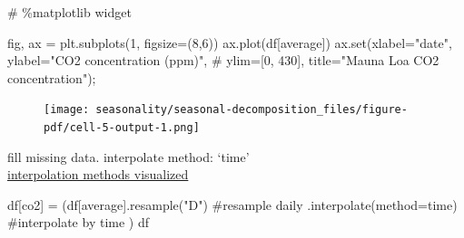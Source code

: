 \documentclass[
  letterpaper,
  DIV=11,
  numbers=noendperiod,
  oneside]{scrreprt}
\newenvironment{Shaded}{\begin{snugshade}}{\end{snugshade}}
\newcommand{\BuiltInTok}[1]{\textcolor[rgb]{0.00,0.23,0.31}{#1}}
\newcommand{\CommentTok}[1]{\textcolor[rgb]{0.37,0.37,0.37}{#1}}
\newcommand{\DecValTok}[1]{\textcolor[rgb]{0.68,0.00,0.00}{#1}}
\newcommand{\NormalTok}[1]{\textcolor[rgb]{0.00,0.23,0.31}{#1}}
\newcommand{\OperatorTok}[1]{\textcolor[rgb]{0.37,0.37,0.37}{#1}}
\newcommand{\StringTok}[1]{\textcolor[rgb]{0.13,0.47,0.30}{#1}}
\begin{document}
\begin{Shaded}
\begin{Highlighting}[]
\CommentTok{\# \%matplotlib widget}

\NormalTok{fig, ax }\OperatorTok{=}\NormalTok{ plt.subplots(}\DecValTok{1}\NormalTok{, figsize}\OperatorTok{=}\NormalTok{(}\DecValTok{8}\NormalTok{,}\DecValTok{6}\NormalTok{))}
\NormalTok{ax.plot(df[}\StringTok{\textquotesingle{}average\textquotesingle{}}\NormalTok{])}
\NormalTok{ax.}\BuiltInTok{set}\NormalTok{(xlabel}\OperatorTok{=}\StringTok{"date"}\NormalTok{,}
\NormalTok{       ylabel}\OperatorTok{=}\StringTok{"CO2 concentration (ppm)"}\NormalTok{,}
       \CommentTok{\# ylim=[0, 430],}
\NormalTok{       title}\OperatorTok{=}\StringTok{"Mauna Loa CO2 concentration"}\NormalTok{)}\OperatorTok{;}
\end{Highlighting}
\end{Shaded}

\begin{figure}[H]

{\centering \texttt{[image: seasonality/seasonal-decomposition\_files/figure-pdf/cell-5-output-1.png]}

}

\end{figure}

fill missing data. interpolate method: `time'\\
\href{https://thepythonyouneed.com/how-to-interpolate-values-with-pandas/}{interpolation
methods visualized}

\begin{Shaded}
\begin{Highlighting}[]
\NormalTok{df[}\StringTok{\textquotesingle{}co2\textquotesingle{}}\NormalTok{] }\OperatorTok{=}\NormalTok{ (df[}\StringTok{\textquotesingle{}average\textquotesingle{}}\NormalTok{].resample(}\StringTok{"D"}\NormalTok{) }\CommentTok{\#resample daily}
\NormalTok{                          .interpolate(method}\OperatorTok{=}\StringTok{\textquotesingle{}time\textquotesingle{}}\NormalTok{) }\CommentTok{\#interpolate by time}
\NormalTok{            )}
\NormalTok{df}
\end{Highlighting}
\end{Shaded}
\end{document}
